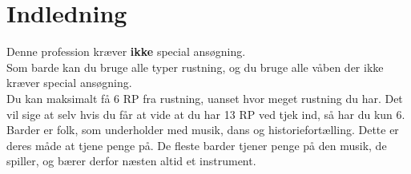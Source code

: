 
\chapter{Indledning}

Denne profession kræver \textbf{ikke} special ansøgning.\\
Som barde kan du bruge alle typer rustning, og du bruge alle våben der ikke kræver special ansøgning.\\
Du kan maksimalt få 6 RP fra rustning, uanset hvor meget rustning du har. Det vil sige at selv hvis du får at vide at du har 13 RP ved tjek ind, så har du kun 6.\\

Barder er folk, som underholder med musik, dans og historiefortælling. Dette er deres måde at tjene penge på. De fleste barder tjener penge på den musik, de spiller, og bærer derfor næsten altid et instrument.
